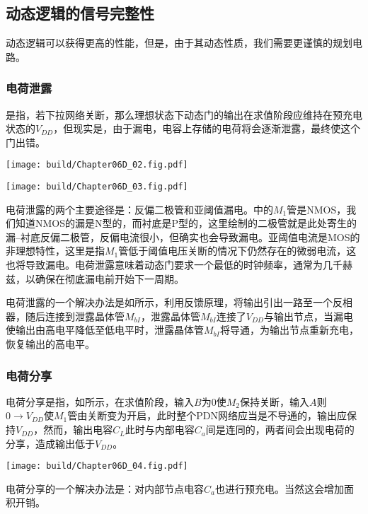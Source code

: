 \subsection{动态逻辑的信号完整性}
动态逻辑可以获得更高的性能，但是，由于其动态性质，我们需要更谨慎的规划电路。

\subsubsection{电荷泄露}
是指，若下拉网络关断，那么理想状态下动态门的输出在求值阶段应维持在预充电状态的$V_{DD}$，但现实是，由于漏电，电容上存储的电荷将会逐渐泄露，最终使这个门出错。
\begin{Figure}[电荷泄露]
    \begin{FigureSub}[电荷泄露的问题]
        \texttt{[image: build/Chapter06D\_02.fig.pdf]}
    \end{FigureSub}
    \hspace{1cm}
    \begin{FigureSub}[电荷泄露的解决]
        \texttt{[image: build/Chapter06D\_03.fig.pdf]}
    \end{FigureSub}
\end{Figure}

电荷泄露的两个主要途径是：反偏二极管和亚阈值漏电。中的$M_1$管是NMOS，我们知道NMOS的漏是N型的，而衬底是P型的，这里绘制的二极管就是此处寄生的漏--衬底反偏二极管，反偏电流很小，但确实也会导致漏电。亚阈值电流是MOS的非理想特性，这里是指$M_1$管低于阈值电压关断的情况下仍然存在的微弱电流，这也将导致漏电。电荷泄露意味着动态门要求一个最低的时钟频率，通常为几千赫兹，以确保在彻底漏电前开始下一周期。

电荷泄露的一个解决办法是如所示，利用反馈原理，将输出引出一路至一个反相器，随后连接到泄露晶体管$M_{bI}$，泄露晶体管$M_{bI}$连接了$V_{DD}$与输出节点，当漏电使输出由高电平降低至低电平时，泄露晶体管$M_{bI}$将导通，为输出节点重新充电，恢复输出的高电平。

\subsubsection{电荷分享}
电荷分享是指，如所示，在求值阶段，输入$B$为$0$使$M_2$保持关断，输入$A$则$0\to V_{DD}$使$M_1$管由关断变为开启，此时整个PDN网络应当是不导通的，输出应保持$V_{DD}$，然而，输出电容$C_L$此时与内部电容$C_a$间是连同的，两者间会出现电荷的分享，造成输出低于$V_{DD}$。
\begin{Figure}[电荷分享]
    \texttt{[image: build/Chapter06D\_04.fig.pdf]}
\end{Figure}
电荷分享的一个解决办法是：对内部节点电容$C_a$也进行预充电。当然这会增加面积开销。